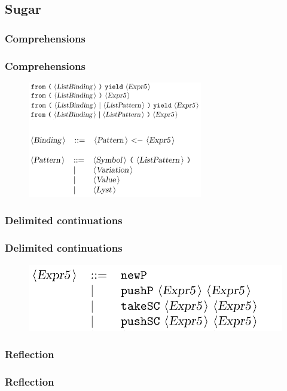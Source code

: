 \documentclass{beamer}
\begin{document}
  \subsection{Sugar}
  \subsubsection{Comprehensions}
  \begin{frame}
    \frametitle{Comprehensions}
    \begin{figure}[ht]
      \begin{center}        
        \includegraphics[height=2in]{pipelinefigures/SyntaxSugarComprehensions.pdf}
      \end{center}      
    \end{figure}
  \end{frame}
  \subsubsection{Delimited continuations}
  \begin{frame}
    \frametitle{Delimited continuations}
    \begin{figure}[ht]
      \begin{center}        
        \includegraphics[width=\textwidth,height=0.3\textheight,keepaspectratio]{pipelinefigures/SyntaxSugarDelimCC.pdf}
      \end{center}      
    \end{figure}
  \end{frame}
  \subsubsection{Reflection}
  \begin{frame}
    \frametitle{Reflection}
  \end{frame}
\end{document}
